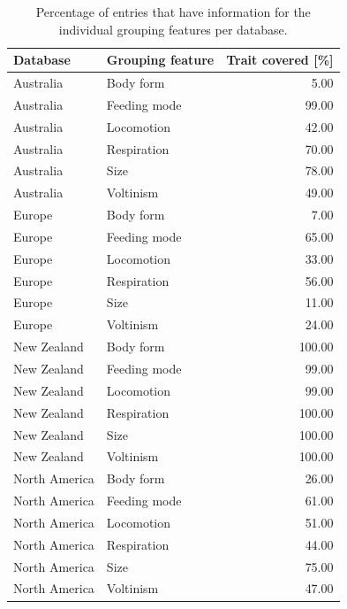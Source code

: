\documentclass{article}
\begin{document}
\begin{table}[H]
  \centering
  \caption{Percentage of entries that have information for the 
  individual grouping features per database.} 
  \label{tab:trait_coverage}
  \begin{tabular}{llr}
    \hline
  Database & Grouping feature & Trait covered [\%] \\ 
    \hline
  Australia & Body form & 5.00 \\ 
    Australia & Feeding mode & 99.00 \\ 
    Australia & Locomotion & 42.00 \\ 
    Australia & Respiration & 70.00 \\ 
    Australia & Size & 78.00 \\ 
    Australia & Voltinism & 49.00 \\ 
    Europe & Body form & 7.00 \\ 
    Europe & Feeding mode & 65.00 \\ 
    Europe & Locomotion & 33.00 \\ 
    Europe & Respiration & 56.00 \\ 
    Europe & Size & 11.00 \\ 
    Europe & Voltinism & 24.00 \\ 
    New Zealand & Body form & 100.00 \\ 
    New Zealand & Feeding mode & 99.00 \\ 
    New Zealand & Locomotion & 99.00 \\ 
    New Zealand & Respiration & 100.00 \\ 
    New Zealand & Size & 100.00 \\ 
    New Zealand & Voltinism & 100.00 \\ 
    North America & Body form & 26.00 \\ 
    North America & Feeding mode & 61.00 \\ 
    North America & Locomotion & 51.00 \\ 
    North America & Respiration & 44.00 \\ 
    North America & Size & 75.00 \\ 
    North America & Voltinism & 47.00 \\ 
    \hline
  \end{tabular}
  \end{table}

\end{document}
